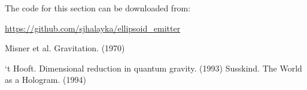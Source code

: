 \documentclass[12pt]{article}
\begin{document}
The code for this section can be downloaded from:

\url{https://github.com/sjhalayka/ellipsoid_emitter}












\begin{thebibliography}{9}

 Misner et al. Gravitation. (1970)

 `t Hooft. Dimensional reduction in quantum gravity. (1993)
 Susskind. The World as a Hologram. (1994)








\end{thebibliography}
\end{document}
